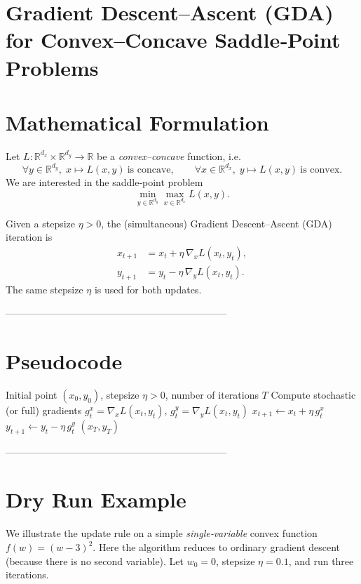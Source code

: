 \documentclass{article}
\begin{document}
\section*{Gradient Descent–Ascent (GDA) for Convex--Concave Saddle‑Point Problems}

\section*{Mathematical Formulation}
Let $L:\mathbb R^{d_x}\times\mathbb R^{d_y}\rightarrow\mathbb R$ be a \emph{convex--concave} function, i.e.
\[
\forall y\in\mathbb R^{d_y},\; x\mapsto L(x,y)\ \text{is concave},\qquad 
\forall x\in\mathbb R^{d_x},\; y\mapsto L(x,y)\ \text{is convex}.
\]
We are interested in the saddle‑point problem
\[
\min_{y\in\mathbb R^{d_y}}\max_{x\in\mathbb R^{d_x}} L(x,y) .
\]

Given a stepsize $\eta>0$, the (simultaneous) Gradient Descent–Ascent (GDA) iteration is
\begin{align}
x_{t+1} &= x_t + \eta \,\nabla_{x} L(x_t,y_t), \label{eq:update_x}\\
y_{t+1} &= y_t - \eta \,\nabla_{y} L(x_t,y_t). \label{eq:update_y}
\end{align}
The same stepsize $\eta$ is used for both updates.

--------------------------------------------------------------------
\section*{Pseudocode}
\begin{algorithm}[H]
\caption{Simultaneous Gradient Descent–Ascent (GDA)}
\begin{algorithmic}[1]
\Require Initial point $(x_0,y_0)$, stepsize $\eta>0$, number of iterations $T$
    \State Compute stochastic (or full) gradients 
          $g^x_t=\nabla_x L(x_t,y_t)$, $g^y_t=\nabla_y L(x_t,y_t)$
    \State $x_{t+1}\gets x_t + \eta\, g^x_t$ 
    \State $y_{t+1}\gets y_t - \eta\, g^y_t$ 
\EndFor
\State \Return $(x_T,y_T)$
\end{algorithmic}
\end{algorithm}

--------------------------------------------------------------------
\section*{Dry Run Example}
We illustrate the update rule on a simple \emph{single‑variable} convex function  
$f(w)=(w-3)^2$.  Here the algorithm reduces to ordinary gradient descent
(because there is no second variable).  Let $w_0=0$, stepsize $\eta=0.1$,
and run three iterations.
\end{document}
